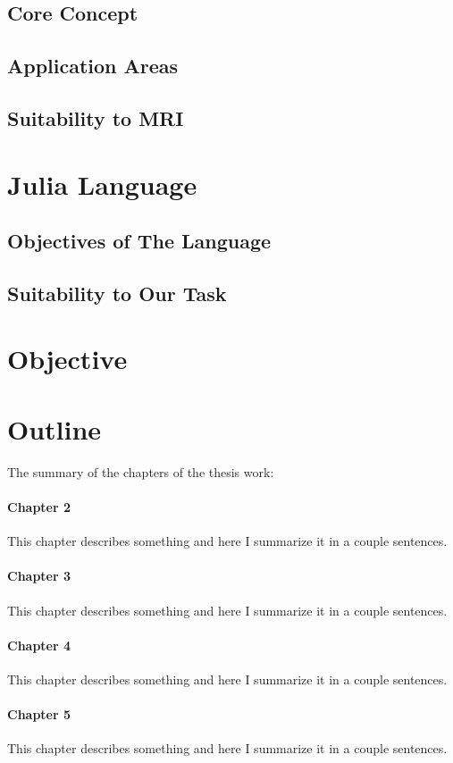 \subsection{Core Concept}
\subsection{Application Areas}
\subsection{Suitability to MRI}

\section{Julia Language}
\subsection{Objectives of The Language}
\subsection{Suitability to Our Task}

\section{Objective}

\section{Outline}
The summary of the chapters of the thesis work:

\paragraph{Chapter 2} This chapter describes something and here I summarize it in a couple sentences.

\paragraph{Chapter 3} This chapter describes something and here I summarize it in a couple sentences.

\paragraph{Chapter 4} This chapter describes something and here I summarize it in a couple sentences.

\paragraph{Chapter 5} This chapter describes something and here I summarize it in a couple sentences.

\clearpage %